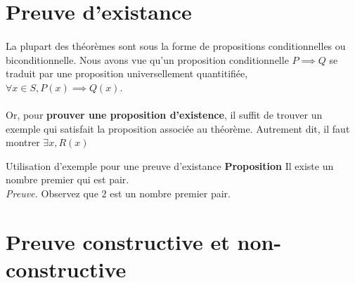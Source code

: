 \documentclass[16pt]{report}
\begin{document}
\begin{multicols*}{2}
        \begin{center}
        \end{center}


        \section{Preuve d'existance}
        
        \paragraph{}
        La plupart des théorèmes sont sous la forme de propositions conditionnelles ou biconditionnelle. Nous avons
        vue qu'un proposition conditionnelle $P \implies  Q$ se traduit par une proposition 
        universellement quantitifiée, $\forall x \in S, P(x) \implies Q(x)$.
        \paragraph{}
        Or, pour \textbf{prouver une proposition d'existence}, il suffit de trouver un exemple qui satisfait 
        la proposition associée au théorème. Autrement dit, il faut montrer $\exists x, R(x)$ 

        \begin{Preuve}{Utilisation d'exemple pour une preuve d'existance}{}
            \textbf{Proposition} \quad Il existe un nombre premier qui est pair. 
            \vspace{1em}\\
            \textit{Preuve.} Observez que $2$ est un nombre premier pair.
        \end{Preuve}
        \section{Preuve constructive et non-constructive}
        

\end{multicols*}
\end{document}
